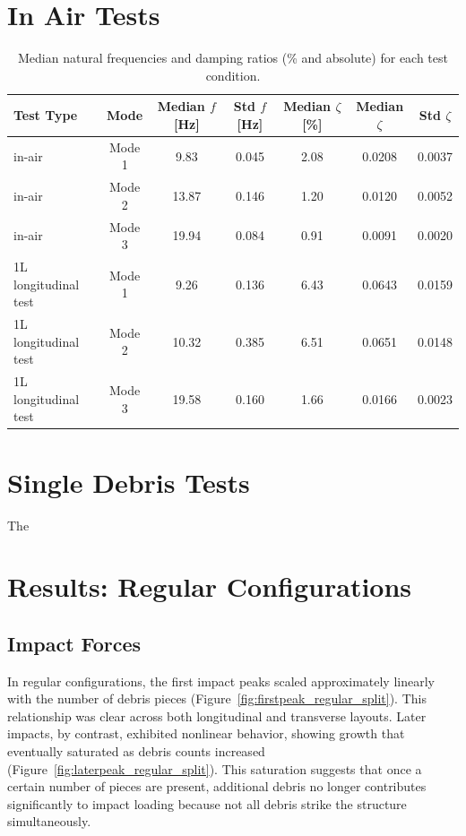 \documentclass{article}
\begin{document}
\section{In Air Tests} 

\begin{table}[ht]
\centering
\begin{tabular}{l c c c c c c}
\hline
Test Type & Mode & Median $f$ [Hz] & Std $f$ [Hz] & Median $\zeta$ [\%] & Median $\zeta$ & Std $\zeta$ \\
\hline
in-air & Mode 1 & 9.83 & 0.045 & 2.08 & 0.0208 & 0.0037 \\
in-air & Mode 2 & 13.87 & 0.146 & 1.20 & 0.0120 & 0.0052 \\
in-air & Mode 3 & 19.94 & 0.084 & 0.91 & 0.0091 & 0.0020 \\
1L longitudinal test & Mode 1 & 9.26 & 0.136 & 6.43 & 0.0643 & 0.0159 \\
1L longitudinal test & Mode 2 & 10.32 & 0.385 & 6.51 & 0.0651 & 0.0148 \\
1L longitudinal test & Mode 3 & 19.58 & 0.160 & 1.66 & 0.0166 & 0.0023 \\
\hline
\end{tabular}
\caption{Median natural frequencies and damping ratios (\% and absolute) for each test condition.}
\label{tab:mode_summary}
\end{table}



\section{Single Debris Tests} 
The 

\section{Results: Regular Configurations}

\subsection{Impact Forces} In regular configurations, the first impact peaks scaled approximately linearly with the number of debris pieces (Figure~\ref{fig:firstpeak_regular_split}). This relationship was clear across both longitudinal and transverse layouts. Later impacts, by contrast, exhibited nonlinear behavior, showing growth that eventually saturated as debris counts increased (Figure~\ref{fig:laterpeak_regular_split}). This saturation suggests that once a certain number of pieces are present, additional debris no longer contributes significantly to impact loading because not all debris strike the structure simultaneously.
\end{document}
